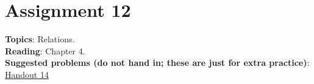 \documentclass[12pt]{article}
\newcommand{\warning}{
\smallskip
\begin{center}
  {\color{red} {\huge\Stopsign} \hspace{1pt}  IN PROGRESS!} {\color{blue}Check back later for the final assignment.} {\color{red} {\huge\Stopsign} }
\end{center}
\smallskip
\AddToShipoutPictureBG*{\AtTextLowerLeft{\llap{\rotatebox[origin=lb]{90}{\large\sffamily\hspace{2.5in}
  {\color{red} {\huge\Stopsign} \hspace{1pt}  IN PROGRESS!} {\color{blue}Check back later for the final assignment.} {\color{red} {\huge\Stopsign} }
      }\quad\rule{0.8pt}{\textheight}\enspace}}}
}
\begin{document}
\newpage
\section[12 (due \csname dateWeek12\endcsname): Relations]{Assignment 12}


\noindent\textbf{Topics}: Relations.
\\

\noindent \textbf{Reading}: Chapter 4.
\\

\noindent \textbf{Suggested problems (do not hand in; these are just for extra practice)}:
\href{https://www.math.emory.edu/~dzb/teaching/250Spring2021/handouts/250-H14-equivalence-relations.pdf}{Handout 14}
\\
\end{document}
